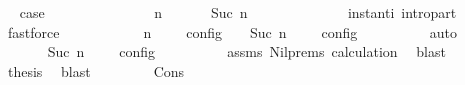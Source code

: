 \begin{isabellebody}
\ \isamarkupfalse%
\ {\isacharquery}case\isanewline
\ \ \ \ \isamarkupfalse%
\ {\isacharminus}\isanewline
\ \ \ \ \ \ \isamarkupfalse%
\ {\isacartoucheopen}{\isacharparenleft}{\isasymGamma}{\isacharcomma}\ n\ {\isasymturnstile}\ {\isacharbrackleft}{\isacharbrackright}\ {\isasymtriangleright}\ {\isasymPhi}{\isacharparenright}\ {\isasymhookrightarrow}\isactrlesup \ {\isacharparenleft}{\isasymGamma}{\isacharcomma}\ Suc\ n\ {\isasymturnstile}\ {\isasymPhi}\ {\isasymtriangleright}\ {\isacharbrackleft}{\isacharbrackright}{\isacharparenright}{\isacartoucheclose}\isanewline
\ \ \ \ \ \ \ \ \isamarkupfalse%
\ instant{\isacharunderscore}i\ intro{\isacharunderscore}part\ \isamarkupfalse%
\ fastforce\isanewline
\ \ \ \ \ \ \isamarkupfalse%
\ \isamarkupfalse%
\ {\isacartoucheopen}{\isasymlbrakk}\ {\isasymGamma}{\isacharcomma}\ n\ {\isasymturnstile}\ {\isacharbrackleft}{\isacharbrackright}\ {\isasymtriangleright}\ {\isasymPhi}\ {\isasymrbrakk}\isactrlsub c\isactrlsub o\isactrlsub n\isactrlsub f\isactrlsub i\isactrlsub g\ {\isacharequal}\ {\isasymlbrakk}\ {\isasymGamma}{\isacharcomma}\ Suc\ n\ {\isasymturnstile}\ {\isasymPhi}\ {\isasymtriangleright}\ {\isacharbrackleft}{\isacharbrackright}\ {\isasymrbrakk}\isactrlsub c\isactrlsub o\isactrlsub n\isactrlsub f\isactrlsub i\isactrlsub g{\isacartoucheclose}\isanewline
\ \ \ \ \ \ \ \ \isamarkupfalse%
\ auto\isanewline
\ \ \ \ \ \ \isamarkupfalse%
\ \isamarkupfalse%
\ {\isacartoucheopen}{\isasymrho}\ {\isasymin}\ {\isasymlbrakk}\ {\isasymGamma}{\isacharcomma}\ Suc\ n\ {\isasymturnstile}\ {\isasymPhi}\ {\isasymtriangleright}\ {\isacharbrackleft}{\isacharbrackright}\ {\isasymrbrakk}\isactrlsub c\isactrlsub o\isactrlsub n\isactrlsub f\isactrlsub i\isactrlsub g{\isacartoucheclose}\isanewline
\ \ \ \ \ \ \ \ \isamarkupfalse%
\ assms\ Nil{\isachardot}prems\ calculation{\isacharparenleft}{}{\isacharparenright}\ \isamarkupfalse%
\ blast\isanewline
\ \ \ \ \ \ \isamarkupfalse%
\ \isamarkupfalse%
\ {\isacharquery}thesis\ \isamarkupfalse%
\ blast\isanewline
\ \ \ \ \isamarkupfalse%
\isanewline
{}\isamarkupfalse%
\isanewline
\ \ \isamarkupfalse%
\ {\isacharparenleft}Cons\ {\isasympsi}\ {\isasymPsi}{\isacharparenright}\isanewline
\ \ \ \ \isamarkupfalse%
\ \isamarkupfalse%

\end{isabellebody}
